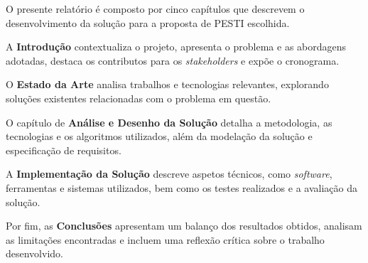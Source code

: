 O presente relatório é composto por cinco capítulos que descrevem o desenvolvimento da solução para a proposta de \gls{PESTI} escolhida.

A \textbf{Introdução} contextualiza o projeto, apresenta o problema e as abordagens adotadas, destaca os contributos para os \textit{stakeholders} e expõe o cronograma.

O \textbf{Estado da Arte} analisa trabalhos e tecnologias relevantes, explorando soluções existentes relacionadas com o problema em questão.

O capítulo de \textbf{Análise e Desenho da Solução} detalha a metodologia, as tecnologias e os algoritmos utilizados, além da modelação da solução e especificação de requisitos.

A \textbf{Implementação da Solução} descreve aspetos técnicos, como \textit{software}, ferramentas e sistemas utilizados, bem como os testes realizados e a avaliação da solução.

Por fim, as \textbf{Conclusões} apresentam um balanço dos resultados obtidos, analisam as limitações encontradas e incluem uma reflexão crítica sobre o trabalho desenvolvido.

\vspace{20mm} 
